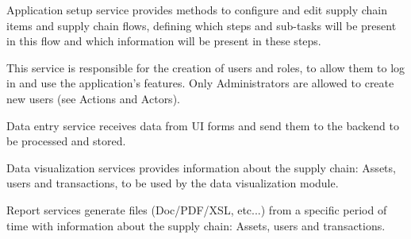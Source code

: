 Application setup service provides methods to configure and edit  supply chain items and supply chain flows, defining which steps and sub-tasks will be present in this flow and which information will be present in these steps.

This service is responsible for the creation of users and roles, to allow them to log in and use the application’s features. Only Administrators are allowed to create new users (see Actions and Actors).

Data entry service receives data from UI forms and send them to the backend to be processed and stored.

Data visualization services provides information about the supply chain: Assets, users and transactions, to be used by the data visualization module.

Report services generate files (Doc/PDF/XSL, etc...) from a specific period of time with information about the supply chain: Assets, users and transactions.